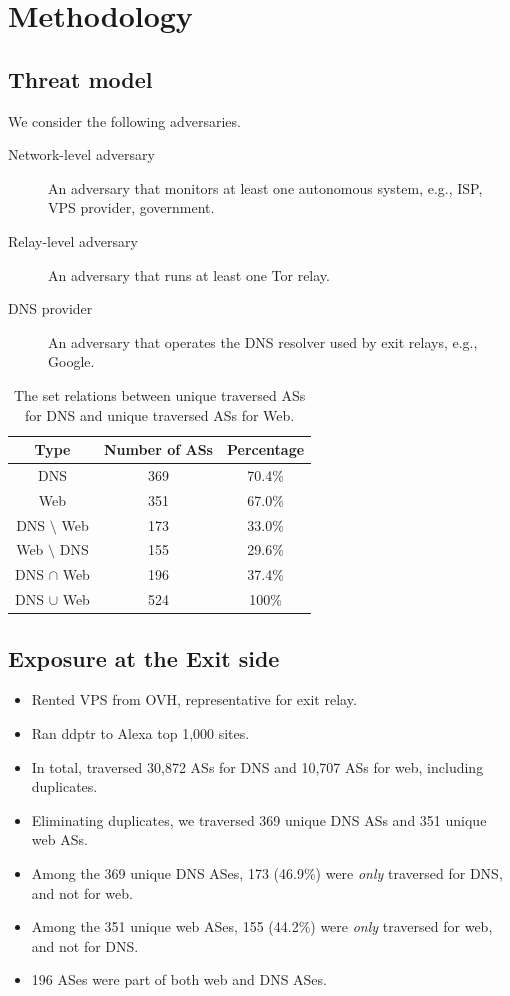 \section{Methodology}
\label{sec:methodology}

\subsection{Threat model}
We consider the following adversaries.
\begin{description}
	\item[Network-level adversary] An adversary that monitors at least
		one autonomous system, e.g., ISP, VPS provider, government.
	\item[Relay-level adversary] An adversary that runs at least one Tor relay.
	\item[DNS provider] An adversary that operates the DNS resolver used
		by exit relays, e.g., Google.
\end{description}

\begin{table}[t]
	\centering
	\begin{tabular}{ccc}
	\textbf{Type} & \textbf{Number of ASs} & \textbf{Percentage} \\
	\hline
	DNS & 369 & 70.4\% \\
	Web & 351 & 67.0\% \\
	DNS $\setminus$ Web & 173 & 33.0\% \\
	Web $\setminus$ DNS & 155 & 29.6\% \\
	DNS $\cap$ Web & 196 & 37.4\% \\
	DNS $\cup$ Web & 524 & 100\% \\
	\end{tabular}
	\caption{The set relations between unique traversed ASs for DNS and unique
	traversed ASs for Web.}
	\label{tab:traversed-ass}
\end{table}

\subsection{Exposure at the Exit side}
\begin{itemize}
	\item Rented VPS from OVH, representative for exit relay.
	\item Ran ddptr to Alexa top 1,000 sites.
	\item In total, traversed 30,872 ASs for DNS and 10,707 ASs for web,
		including duplicates.
	\item Eliminating duplicates, we traversed 369 unique DNS ASs and 351 unique
		web ASs.
	\item Among the 369 unique DNS ASes, 173 (46.9\%) were \emph{only} traversed
		for DNS, and not for web.
	\item Among the 351 unique web ASes, 155 (44.2\%) were \emph{only} traversed
		for web, and not for DNS.
	\item 196 ASes were part of both web and DNS ASes.
\end{itemize}

